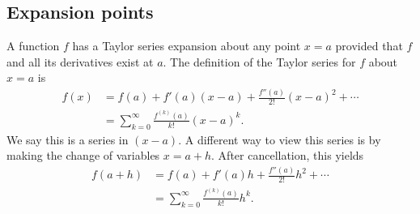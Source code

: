 \documentclass[twoside,openright,titlepage,a4paper]{book}
\begin{document}
\begin{sloppypar}
\subsection{Expansion points}
A function $f$ has a Taylor series expansion about any point $x=a$ provided that $f$ and all its derivatives exist at $a$. The definition of the Taylor series for $f$ about $x=a$ is
\begin{align*}
f(x) &= f(a) + f'(a)(x-a) + \frac{f''(a)}{2!}(x-a)^2 + \dotsb \\
&= \sum_{k=0}^\infty \frac{f^{\left(k\right)}(a)}{k!}(x-a)^k. 
\end{align*}
We say this is a series in $(x-a)$. A different way to view this series is by making the change of variables $x = a+h$. After cancellation, this yields
\begin{align*} 
f(a+h) &= f(a) + f'(a)h + \frac{f''(a)}{2!}h^2 + \dotsb \\
&= \sum_{k=0}^\infty \frac{f^{\left(k\right)}(a)}{k!}h^k. 
\end{align*}

\end{sloppypar}
\end{document}
